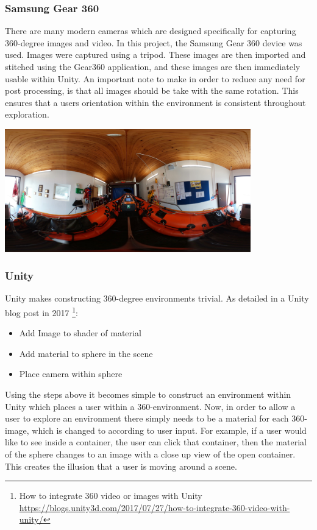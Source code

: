 \documentclass[a4paper, openright, twoside]{report}
\begin{document}
\subsubsection{Samsung Gear 360}
There are many modern cameras which are designed specifically for capturing 360-degree images and video. In this project, the Samsung Gear 360 device was used. Images were captured using a tripod. These images are then imported and stitched using the Gear360 application, and these images are then immediately usable within Unity. An important note to make in order to reduce any need for post processing, is that all images should be take with the same rotation. This ensures that a users orientation within the environment is consistent throughout exploration. 

\begin{center}
\hfill \break
\includegraphics[width=0.8\textwidth]{images/centre}
\label{model}
\hfill \break
\end{center}

\subsubsection{Unity}
Unity makes constructing 360-degree environments trivial. As detailed in a Unity blog post in 2017 \footnote{How to integrate 360 video or images with Unity \url{https://blogs.unity3d.com/2017/07/27/how-to-integrate-360-video-with-unity/}}: 

\begin{itemize}
\item Add Image to shader of material
\item Add material to sphere in the scene
\item Place camera within sphere
\end{itemize}

Using the steps above it becomes simple to construct an environment within Unity which places a user within a 360-environment. Now, in order to allow a user to explore an environment there simply needs to be a material for each 360-image, which is changed to according to user input. For example, if a user would like to see inside a container, the user can click that container, then the material of the sphere changes to an image with a close up view of the open container. This creates the illusion that a user is moving around a scene. 
\end{document}
